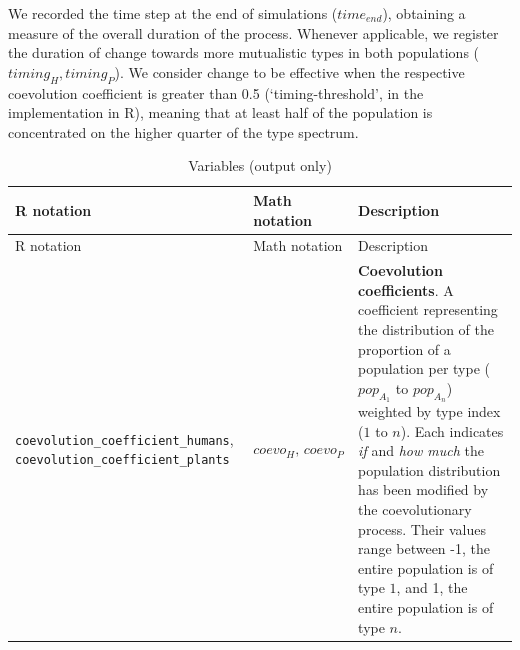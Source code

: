 \documentclass[
]{book}
\begin{document}
We recorded the time step at the end of simulations (\(time_{end}\)), obtaining a measure of the overall duration of the process. Whenever applicable, we register the duration of change towards more mutualistic types in both populations (\(timing_H, timing_P\)). We consider change to be effective when the respective coevolution coefficient is greater than 0.5 (`timing-threshold', in the implementation in R), meaning that at least half of the population is concentrated on the higher quarter of the type spectrum.

\begin{longtable}[]{@{}lll@{}}
\caption{Variables (output only)}\tabularnewline
\toprule
\begin{minipage}[b]{0.36\columnwidth}\raggedright
R notation\strut
\end{minipage} & \begin{minipage}[b]{0.21\columnwidth}\raggedright
Math notation\strut
\end{minipage} & \begin{minipage}[b]{0.34\columnwidth}\raggedright
Description\strut
\end{minipage}\tabularnewline
\midrule
\endfirsthead
\toprule
\begin{minipage}[b]{0.36\columnwidth}\raggedright
R notation\strut
\end{minipage} & \begin{minipage}[b]{0.21\columnwidth}\raggedright
Math notation\strut
\end{minipage} & \begin{minipage}[b]{0.34\columnwidth}\raggedright
Description\strut
\end{minipage}\tabularnewline
\midrule
\endhead
\begin{minipage}[t]{0.36\columnwidth}\raggedright
\texttt{coevolution\_coefficient\_humans}, \texttt{coevolution\_coefficient\_plants}\strut
\end{minipage} & \begin{minipage}[t]{0.21\columnwidth}\raggedright
\(coevo_{H},\,coevo_{P}\)\strut
\end{minipage} & \begin{minipage}[t]{0.34\columnwidth}\raggedright
\textbf{Coevolution coefficients}. A coefficient representing the distribution of the proportion of a population per type (\(pop_{A_1}\) to \(pop_{A_n}\)) weighted by type index (\(1\) to \(n\)). Each indicates \emph{if} and \emph{how much} the population distribution has been modified by the coevolutionary process. Their values range between -1, the entire population is of type \(1\), and 1, the entire population is of type \(n\).\strut

\end{minipage}
\end{longtable}
\end{document}
